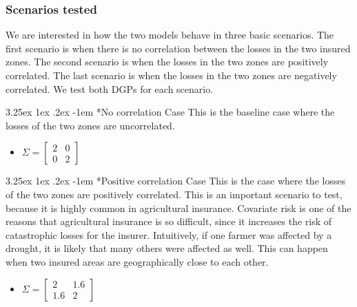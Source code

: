 \documentclass[11pt]{article}
\makeatletter
\renewcommand\paragraph{\@startsection{paragraph}{5}{\z@}%
  {3.25ex \@plus1ex \@minus.2ex}%
  {-1em}%
  {\normalfont\normalsize\bfseries}}
\makeatother
\begin{document}
    \subsubsection{Scenarios tested}
      We are interested in how the two models behave in three basic scenarios. The first scenario is when there is no correlation between the losses in the two insured zones. The second scenario is when the losses in the two zones are positively correlated. The last scenario is when the losses in the two zones are negatively correlated. We test both DGPs for each scenario. 

      \paragraph*{No correlation Case}
       This is the baseline case where the losses of the two zones are uncorrelated. 
        \begin{itemize}
            \item $\Sigma = \begin{bmatrix}
                2 & 0 \\
                0 & 2 
                \end{bmatrix} $
        \end{itemize}

      \paragraph*{Positive correlation Case}
        This is the case where the losses of the two zones are positively correlated. This is an important scenario to test, because it is highly common in agricultural insurance. Covariate risk is one of the reasons that agricultural insurance is so difficult, since it increases the risk of catastrophic losses for the insurer. Intuitively, if one farmer was affected by a drought, it is likely that many others were affected as well. This can happen when two insured areas are geographically close to each other. 
        \begin{itemize}
            \item $\Sigma = \begin{bmatrix}
                2 & 1.6 \\
                1.6 & 2 
                \end{bmatrix} $
        \end{itemize}
\end{document}
